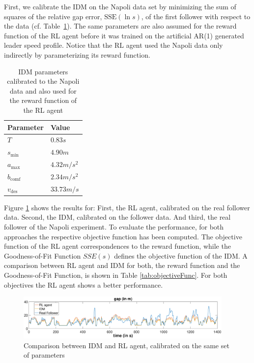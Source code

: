 \documentclass[review]{elsarticle}
\providecommand{\sub}[1]{_{\mathrm{#1}}}  %
\providecommand{\3}{{\ss}}
\begin{document}
First, we calibrate the IDM on the Napoli data set by
minimizing the sum of squares of the relative gap error,
$\mathrm{SSE}(\ln s)$, of the first follower with respect to the
data (cf. Table~\ref{tab:IDMparameters}). The same parameters are also
assumed for the reward function of the RL agent before it was trained
on the artificial AR(1) generated leader speed profile. Notice that the RL agent used the Napoli data only
indirectly by parameterizing its reward function.
\begin{table}
	\caption{IDM parameters calibrated to the Napoli
            data and also used for the reward function of the RL agent}
	\label{tab:IDMparameters} 
	\begin{center}
		\begin{tabular}{ p{} |p{}  } 
		Parameter & Value   \\ \hline
			$T$ & $0.83s$\\
			$s\sub{min}$ & $4.90m$\\
			$a\sub{max}$ & $4.32m/s^2$\\
			$b\sub{comf}$ & $2.34 m/s^2$\\
			$v\sub{des}$ & $33.73m/s$
			
		\end{tabular}
	\end{center}
\end{table}

Figure \ref{fig:IDMvsRL} shows the results for: First, the RL agent, calibrated on the real follower data. Second, the IDM, calibrated on the follower data. And third, the real follower of the Napoli experiment. To evaluate the performance, for both approaches the respective objective function has been computed. The objective function of the RL agent correspondences to the reward function, while the Goodness-of-Fit Function $SSE(s)$ defines the objective function of the IDM. A comparison between RL agent and IDM for both, the reward function and the Goodness-of-Fit Function, is shown in Table \ref{tab:objectiveFunc}. For both objectives the RL agent shows a better performance.

\begin{figure}
	
	\centering
	\includegraphics[width=0.95\textwidth]{images/IDMvsRL_dist}
	\caption{Comparison between IDM and RL agent, calibrated on the same set of parameters}
	\label{fig:IDMvsRL}
\end{figure}
\end{document}

